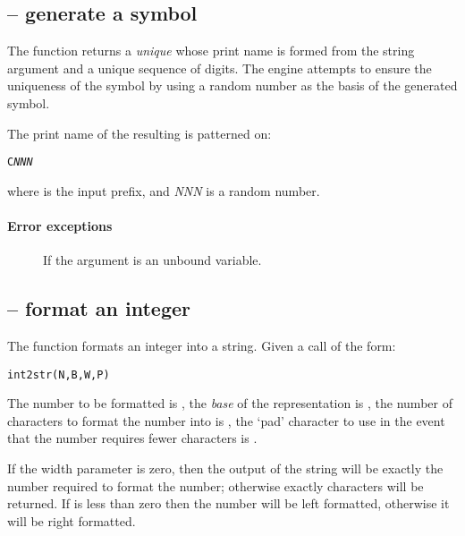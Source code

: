 \subsection{ -- generate a symbol}
\label{string:gensym}


The  function returns a \emph{unique}  whose print name is formed from the string argument and a unique sequence of digits. The \go engine attempts to ensure the uniqueness of the symbol by using a random number as the basis of the generated symbol.

The print name of the resulting  is patterned on:
\begin{alltt}
C\emph{NNN}
\end{alltt}
where  is the input prefix, and \emph{NNN} is a random number.

\paragraph{Error exceptions}
\begin{description}
\item[]
If the argument is an unbound variable.
\end{description}

\subsection{ -- format an integer}
\label{string:int2str}


The  function formats an integer into a string. Given a call of the form:
\begin{alltt}
int2str(N,B,W,P)
\end{alltt}
The number to be formatted is , the \emph{base} of the representation is , the number of characters to format the number into is , the `pad' character to use in the event that the number requires fewer characters is .

If the width parameter  is zero, then the output of the string will be exactly the number required to format the number; otherwise exactly  characters will be returned. If  is less than zero then the number will be left formatted, otherwise it will be right formatted.

